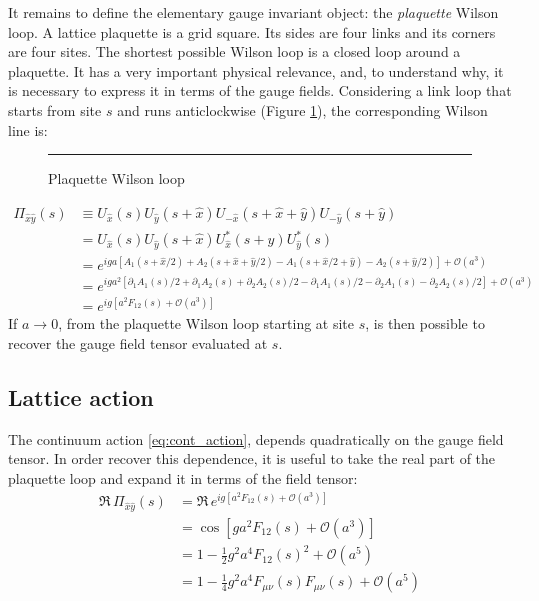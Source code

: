 It remains to define the elementary gauge invariant object: the \emph{plaquette} Wilson loop.
A lattice plaquette is a grid square. Its sides are four links and its corners are four sites.
The shortest possible Wilson loop is a closed loop around a plaquette.
It has a very important physical relevance, and, to understand why,
it is necessary to express it in terms of the gauge fields.
Considering a link loop that starts from site $s$ and runs anticlockwise (Figure \ref{fig:plaq}),
the corresponding Wilson line is:
\begin{figure}[!htb]
    \centering
    \rule{3in}{1.5in}
    \caption{Plaquette Wilson loop}
    \label{fig:plaq}
\end{figure}
\begin{equation*}%
    \begin{aligned}
        \Pi_{\hat x\hat y}(s) &\equiv U_{\hat x}(s) U_{\hat y}(s+\hat x) U_{-\hat x}(s+\hat x+\hat y) U_{-\hat y}(s+\hat y) \\
                              &= U_{\hat x}(s) U_{\hat y}(s+\hat x) U^*_{\hat x}(s+\hat y) U^*_{\hat y}(s) \\
                              &= e^{iga[A_1(s+\hat x/2) + A_2(s+\hat x+\hat y/2) - A_1(s+\hat x/2+\hat y) - A_2(s+\hat y/2)]+ \mathcal O\left(a^3\right)} \\
                              &= e^{iga^2[\partial_1A_1(s)/2 + \partial_1A_2(s) + \partial_2A_2(s)/2 - \partial_1A_1(s)/2 - \partial_2A_1(s) - \partial_2A_2(s)/2] %
                                    + \mathcal O\left(a^3\right)} \\
                              &= e^{ig\left[a^2F_{12}(s) + \mathcal O\left(a^3\right)\right]}
    \end{aligned}
\end{equation*}
If $a \to 0$, from the plaquette Wilson loop starting at site $s$, is then possible to recover the gauge field tensor evaluated at $s$.

\subsection*{Lattice action}

The continuum action \eqref{eq:cont_action}, depends quadratically on the gauge field tensor.
In order recover this dependence, it is useful to take the real part of the plaquette loop and expand it in terms of the field tensor:
\begin{align*}
    \Re\,\Pi_{\hat x\hat y}(s) &= \Re\,e^{ig\left[a^2F_{12}(s) + \mathcal O\left(a^3\right)\right]} \\
                                          &= \cos\left[ga^2F_{12}(s) + \mathcal O\left(a^3\right)\right] \\
                                          &= 1 - \frac{1}{2}g^2a^4F_{12}(s)^2 + \mathcal O\left(a^5\right) \\
                                          &= 1 - \frac{1}{4}g^2a^4F_{\mu\nu}(s)F_{\mu\nu}(s) + \mathcal O\left(a^5\right)
\end{align*}

